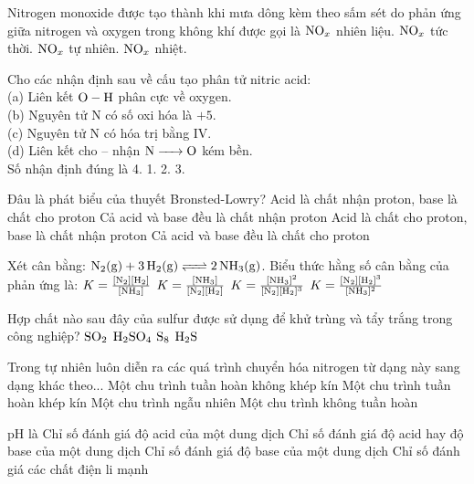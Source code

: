\documentclass[12pt,a4paper]{article}
\begin{document}
\begin{ex}
Nitrogen monoxide được tạo thành khi mưa dông kèm theo sấm sét do phản ứng giữa nitrogen và oxygen trong không khí được gọi là
\choice
{$\ce{NO_x}$ nhiên liệu.}
{$\ce{NO_x}$ tức thời.}
{$\ce{NO_x}$ tự nhiên.}
{$\ce{NO_x}$ nhiệt.}
\loigiai{}
\end{ex}

\begin{ex}
Cho các nhận định sau về cấu tạo phân tử nitric acid:\\
(a) Liên kết $\ce{O - H}$ phân cực về oxygen.\\
(b) Nguyên tử N có số oxi hóa là $+5$.\\
(c) Nguyên tử N có hóa trị bằng IV.\\
(d) Liên kết cho -- nhận $\ce{N -> O}$ kém bền.\\
Số nhận định đúng là
\choice
{4.}
{1.}
{2.}
{3.}
\loigiai{}
\end{ex}

\begin{ex}
Đâu là phát biểu của thuyết Bronsted-Lowry?
\choice
{Acid là chất nhận proton, base là chất cho proton}
{Cả acid và base đều là chất nhận proton}
{Acid là chất cho proton, base là chất nhận proton}
{Cả acid và base đều là chất cho proton}
\loigiai{}
\end{ex}

\begin{ex}
Xét cân bằng: $\ce{N2(g) + 3H2(g) <=> 2NH3(g)}$. Biểu thức hằng số cân bằng của phản ứng là:
\choice
{$K = \frac{[\ce{N2}][\ce{H2}]}{[\ce{NH3}]}$}
{$K = \frac{[\ce{NH3}]}{[\ce{N2}][\ce{H2}]}$}
{$K = \frac{[\ce{NH3}]^2}{[\ce{N2}][\ce{H2}]^3}$}
{$K = \frac{[\ce{N2}][\ce{H2}]^3}{[\ce{NH3}]^2}$}
\loigiai{}
\end{ex}

\begin{ex}
Hợp chất nào sau đây của sulfur được sử dụng để khử trùng và tẩy trắng trong công nghiệp?
\choice
{$\ce{SO2}$}
{$\ce{H2SO4}$}
{$\ce{S8}$}
{$\ce{H2S}$}
\loigiai{}
\end{ex}

\begin{ex}
Trong tự nhiên luôn diễn ra các quá trình chuyển hóa nitrogen từ dạng này sang dạng khác theo...
\choice
{Một chu trình tuần hoàn không khép kín}
{Một chu trình tuần hoàn khép kín}
{Một chu trình ngẫu nhiên}
{Một chu trình không tuần hoàn}
\loigiai{}
\end{ex}

\begin{ex}
pH là
\choice
{Chỉ số đánh giá độ acid của một dung dịch}
{Chỉ số đánh giá độ acid hay độ base của một dung dịch}
{Chỉ số đánh giá độ base của một dung dịch}
{Chỉ số đánh giá các chất điện li mạnh}
\loigiai{}
\end{ex}
\end{document}
